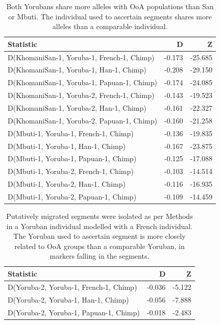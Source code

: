 \documentclass{article}
\begin{document}
\begin{table}[ht]
\centering
\begin{tabular}{lrr}
  \hline
Statistic & D & Z \\ 
  \hline
D(KhomaniSan-1, Yoruba-1, French-1, Chimp) & -0.173 & -25.685 \\ 
  D(KhomaniSan-1, Yoruba-1, Han-1, Chimp) & -0.208 & -29.150 \\ 
  D(KhomaniSan-1, Yoruba-1, Papuan-1, Chimp) & -0.174 & -24.085 \\ 
  D(KhomaniSan-1, Yoruba-2, French-1, Chimp) & -0.143 & -19.523 \\ 
  D(KhomaniSan-1, Yoruba-2, Han-1, Chimp) & -0.161 & -22.327 \\ 
  D(KhomaniSan-1, Yoruba-2, Papuan-1, Chimp) & -0.160 & -21.258 \\ 
  D(Mbuti-1, Yoruba-1, French-1, Chimp) & -0.136 & -19.835 \\ 
  D(Mbuti-1, Yoruba-1, Han-1, Chimp) & -0.167 & -23.875 \\ 
  D(Mbuti-1, Yoruba-1, Papuan-1, Chimp) & -0.125 & -17.088 \\ 
  D(Mbuti-1, Yoruba-2, French-1, Chimp) & -0.103 & -14.514 \\ 
  D(Mbuti-1, Yoruba-2, Han-1, Chimp) & -0.116 & -16.935 \\ 
  D(Mbuti-1, Yoruba-2, Papuan-1, Chimp) & -0.109 & -14.459 \\ 
   \hline
\end{tabular}
\caption{Both Yorubans share more alleles with OoA populations than San or Mbuti. The individual used to ascertain segments shares more alleles than a comparable individual.} 
\label{dstats:a2}
\end{table}
\begin{table}[ht]
\centering
\begin{tabular}{lrr}
  \hline
Statistic & D & Z \\ 
  \hline
D(Yoruba-2, Yoruba-1, French-1, Chimp) & -0.036 & -5.122 \\ 
  D(Yoruba-2, Yoruba-1, Han-1, Chimp) & -0.056 & -7.888 \\ 
  D(Yoruba-2, Yoruba-1, Papuan-1, Chimp) & -0.018 & -2.483 \\ 
   \hline
\end{tabular}
\caption{Putatively migrated segments were isolated as per Methods in a Yoruban individual modelled with a French individual. The Yoruban used to ascertain segment is more closely related to OoA groups than a comparable Yoruban, in markers falling in the segments.} 
\label{dstats:a3}
\end{table}
\end{document}
